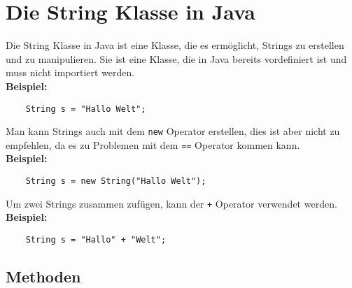 \documentclass[a4paper, 12pt]{report}
\begin{document}
	\thispagestyle{empty}

    \chapter*{Die String Klasse in Java}
    Die String Klasse in Java ist eine Klasse, die es ermöglicht, Strings zu erstellen und zu manipulieren.
    Sie ist eine Klasse, die in Java bereits vordefiniert ist und muss nicht importiert werden.\\
    \textbf{Beispiel:}
    \begin{verbatim}
    String s = "Hallo Welt";
    \end{verbatim}
    Man kann Strings auch mit dem \texttt{new} Operator erstellen, dies ist aber nicht zu empfehlen, da es zu Problemen mit dem \texttt{==} Operator kommen kann.\\
    \textbf{Beispiel:}
    \begin{verbatim}
    String s = new String("Hallo Welt");
    \end{verbatim}
    Um zwei Strings zusammen zufügen, kann der \texttt{+} Operator verwendet werden.\\
    \textbf{Beispiel:}
    \begin{verbatim}
    String s = "Hallo" + "Welt";
    \end{verbatim}


    \section*{Methoden}
\end{document}
